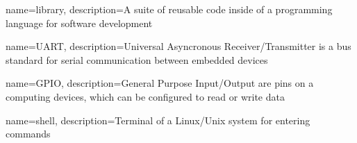 {
    name={library},
    description={A suite of reusable code inside of a programming language for software development}
}

{
    name={UART},
    description={Universal Asyncronous Receiver/Transmitter is a bus standard for serial communication between embedded devices}
}

{
    name={GPIO},
    description={General Purpose Input/Output are pins on a computing devices, which can be configured to read or write data}
}

{
    name={shell},
    description={Terminal of a Linux/Unix system for entering commands}
}



\glsaddall
